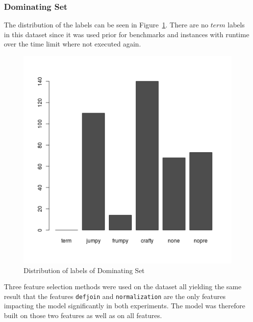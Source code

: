 \subsubsection{Dominating Set}
The distribution of the labels can be seen in Figure~\ref{fig:dsLabelsE1}. There are no $term$ labels in this dataset since it was used prior for benchmarks and instances with runtime over the time limit where not executed again.
\begin{figure}[h]
	\center
	\includegraphics[scale=0.4]{figures/domsetLabelsE1.png}
	\caption{Distribution of labels of Dominating Set\label{fig:dsLabelsE1}}
\end{figure}
\par Three feature selection methods were used on the dataset all yielding the same result that the features \lstinline$defjoin$ and \lstinline$normalization$ are the only features impacting the model significantly in both experiments. The model was therefore built on those two features as well as on all features.

